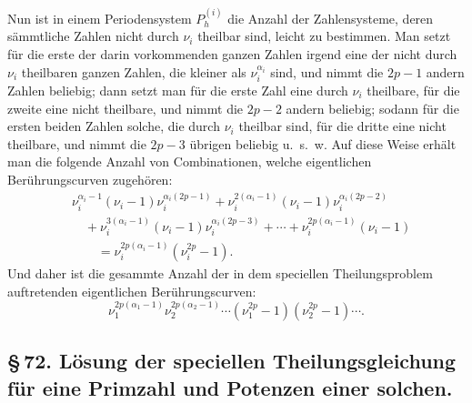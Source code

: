 \documentclass[10pt]{article}
\begin{document}
Nun ist in einem Periodensystem \(P_h^{(i)}\) die Anzahl der Zahlensysteme, deren sämmtliche Zahlen nicht durch \(\nu_i\) theilbar sind, leicht zu bestimmen. Man setzt für die erste der darin vorkommenden ganzen Zahlen irgend eine der nicht durch \(\nu_i\) theilbaren ganzen Zahlen, die kleiner als \(\nu_i^{\alpha_i}\) sind, und nimmt die \(2p-1\) andern Zahlen beliebig; dann setzt man für die erste Zahl eine durch \(\nu_i\) theilbare, für die zweite eine nicht theilbare, und nimmt die \(2p-2\) andern beliebig; sodann für die ersten beiden Zahlen solche, die durch \(\nu_i\) theilbar sind, für die dritte eine nicht theilbare, und nimmt die \(2p-3\) übrigen beliebig u.~s.~w. Auf diese Weise erhält man die folgende Anzahl von Combinationen, welche eigentlichen Berührungscurven zugehören:
\[
\begin{aligned}
&\nu_i^{\alpha_i-1}(\nu_i-1)\nu_i^{\alpha_i(2p-1)}
+\nu_i^{2(\alpha_i-1)}(\nu_i-1)\nu_i^{\alpha_i(2p-2)}\\
&\quad+\nu_i^{3(\alpha_i-1)}(\nu_i-1)\nu_i^{\alpha_i(2p-3)}
+\cdots+\nu_i^{2p(\alpha_i-1)}(\nu_i-1)\\
&\qquad=\nu_i^{2p(\alpha_i-1)}(\nu_i^{2p}-1).
\end{aligned}
\]
Und daher ist die gesammte Anzahl der in dem speciellen Theilungsproblem auftretenden eigentlichen Berührungscurven:
\[
\nu_1^{2p(\alpha_1-1)}\nu_2^{2p(\alpha_2-1)}\cdots
(\nu_1^{2p}-1)(\nu_2^{2p}-1)\cdots.
\]

\subsection*{\S\,72. Lösung der speciellen Theilungsgleichung für eine Primzahl und Potenzen einer solchen.}
\end{document}

